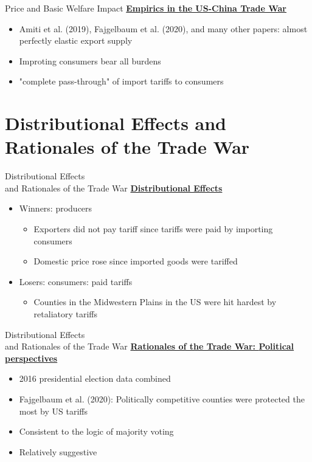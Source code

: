 \documentclass{beamer}
\begin{document}
\begin{frame}{Price and Basic Welfare Impact}
    \underline{\textbf{Empirics in the US-China Trade War}}
    \begin{itemize}
        \item Amiti et al. (2019), Fajgelbaum et al. (2020), and many other papers: 
        almost {\color{red}perfectly elastic} export supply
        \item Improting consumers bear all burdens 
        \item {\color{red}"complete pass-through"} of import tariffs to consumers
    \end{itemize}
\end{frame}

\section{Distributional Effects and Rationales of the Trade War}
\begin{frame}{Distributional Effects \\ and Rationales of the Trade War}
\underline{\textbf{Distributional Effects}}
\begin{itemize}
    \item Winners: producers
    \begin{itemize}
        \item Exporters did {\color{red}not} pay tariff since tariffs were paid by importing consumers
        \item {\color{red}Domestic price rose} since imported goods were tariffed
    \end{itemize}
    \item Losers: consumers: paid tariffs
    \begin{itemize}
        \item Counties in the Midwestern Plains in the US were hit hardest by retaliatory tariffs
    \end{itemize}
\end{itemize}
\end{frame}

\begin{frame}{Distributional Effects \\ and Rationales of the Trade War}
\underline{\textbf{Rationales of the Trade War: {\color{red}Political} perspectives}}
\begin{itemize}
    \item 2016 presidential election data combined
    \item Fajgelbaum et al. (2020): {\color{red}Politically competitive} counties were protected the most by US tariffs
    \item Consistent to the logic of {\color{red}majority voting}
    \item Relatively suggestive
\end{itemize}
\end{frame}
\end{document}
